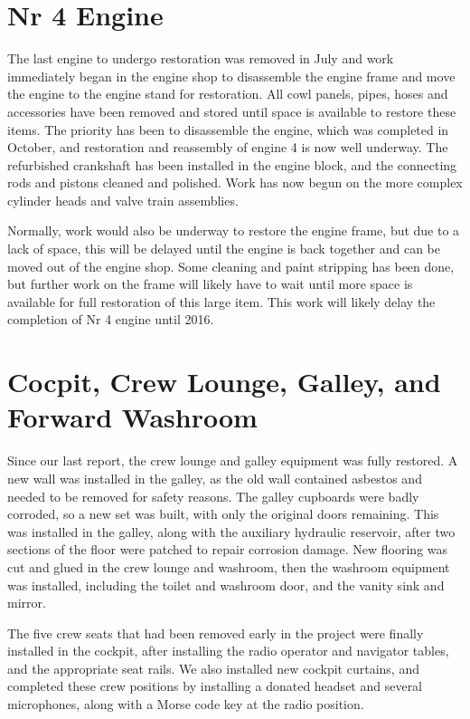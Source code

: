 \section{Nr 4 Engine}
\label{sec:engine_4}

The last engine to undergo restoration was removed in July and work
immediately began in the engine shop to disassemble the engine frame
and move the engine to the engine stand for restoration.  All cowl
panels, pipes, hoses and accessories have been removed and stored
until space is available to restore these items.  The priority has
been to disassemble the engine, which was completed in October, and
restoration and reassembly of engine 4 is now well underway.  The
refurbished crankshaft has been installed in the engine block, and the
connecting rods and pistons cleaned and polished.  Work has now begun
on the more complex cylinder heads and valve train assemblies.

Normally, work would also be underway to restore the engine frame, but
due to a lack of space, this will be delayed until the engine is back
together and can be moved out of the engine shop.  Some cleaning and
paint stripping has been done, but further work on the frame will
likely have to wait until more space is available for full restoration
of this large item.  This work will likely delay the completion of Nr
4 engine until 2016.

\section{Cocpit, Crew Lounge, Galley,  and Forward Washroom}
\label{crewlounge}

Since our last report, the crew lounge and galley equipment was fully
restored.  A new wall was installed in the galley, as the old wall
contained asbestos and needed to be removed for safety reasons.  The
galley cupboards were badly corroded, so a new set was built, with
only the original doors remaining.  This was installed in the galley,
along with the auxiliary hydraulic reservoir, after two sections of
the floor were patched to repair corrosion damage.  New flooring was
cut and glued in the crew lounge and washroom, then the washroom
equipment was installed, including the toilet and washroom door, and
the vanity sink and mirror.

The five crew seats that had been removed early in the project were
finally installed in the cockpit, after installing the radio operator
and navigator tables, and the appropriate seat rails.  We also
installed new cockpit curtains, and completed these crew positions by
installing a donated headset and several microphones, along with a
Morse code key at the radio position.

